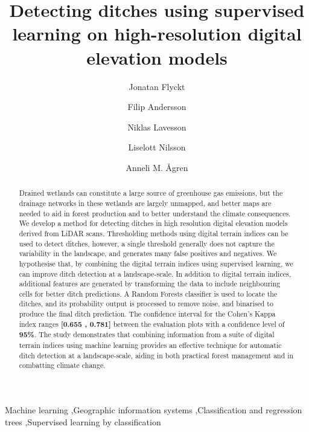 \documentclass[11pt, review]{elsarticle} %
\begin{document}
\begin{frontmatter}
\title{Detecting ditches using supervised learning on high-resolution digital elevation models}

\author[ju]{Jonatan Flyckt}

\author[ju]{Filip Andersson}

\author[ju]{Niklas Lavesson}

\author[fa]{Liselott Nilsson}

\author[slu]{Anneli M. \AA gren}

\address[ju]{J\"onk\"oping Artificial Intelligence Laboratory, J\"onk\"oping University, Gjuterigatan 5, 551 11, J\"onk\"oping, Sweden}
\address[fa]{Forest Department, Swedish Forest Agency, Skeppargatan 17, 931 32 Skellefte\aa, Sweden}
\address[slu]{Department of Forest Ecology and Management, Swedish University of Agricultural Sciences, SLU, Skogsmarksgr\"and 17, 901 83, Ume\aa, Sweden}

\begin{abstract}
{\footnotesize
Drained wetlands can constitute a large source of greenhouse gas emissions, but the drainage networks in these wetlands are largely unmapped, and better maps are needed to aid in forest production and to better understand the climate consequences. We develop a method for detecting ditches in high resolution digital elevation models derived from LiDAR scans. Thresholding methods using digital terrain indices can be used to detect ditches, however, a single threshold generally does not capture the variability in the landscape, and generates many false positives and negatives. We hypothesise that, by combining the digital terrain indices using supervised learning, we can improve ditch detection at a landscape-scale. In addition to digital terrain indices, additional features are generated by transforming the data to include neighbouring cells for better ditch predictions. A Random Forests classifier is used to locate the ditches, and its probability output is processed to remove noise, and binarised to produce the final ditch prediction. The confidence interval for the Cohen's Kappa index ranges \textbf{[0.655 , 0.781]} between the evaluation plots with a confidence level of \textbf{95\%}. The study demonstrates that combining information from  a suite of digital terrain indices using machine learning provides an effective technique for automatic ditch detection at a landscape-scale, aiding in both practical forest management and in combatting climate change.}
\end{abstract}

\begin{keyword}
{\footnotesize
Machine learning \sep Geographic information systems \sep Classification and regression trees \sep Supervised learning by classification}
\end{keyword}

\end{frontmatter}
\end{document}
